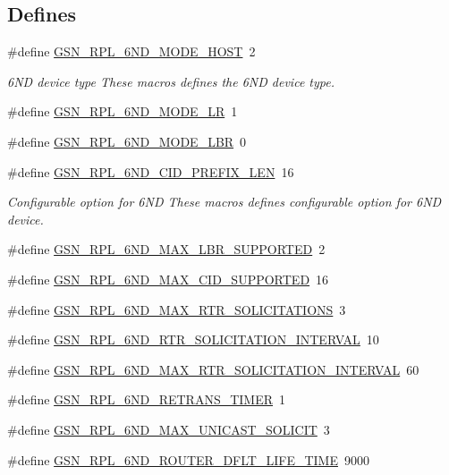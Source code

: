 \subsection*{Defines}
\begin{DoxyCompactItemize}
\item 
\#define \hyperlink{a00473_a189e6e0e1158b69710738801abe2bcbd}{GSN\_\-RPL\_\-6ND\_\-MODE\_\-HOST}~2
\begin{DoxyCompactList}\small\item\em 6ND device type These macros defines the 6ND device type. \end{DoxyCompactList}\item 
\#define \hyperlink{a00473_a53a1539675f4ce93068d86f3e7b1ea64}{GSN\_\-RPL\_\-6ND\_\-MODE\_\-LR}~1
\item 
\#define \hyperlink{a00473_aa4574cefa86dc0bb763c7a4125767ba1}{GSN\_\-RPL\_\-6ND\_\-MODE\_\-LBR}~0
\item 
\#define \hyperlink{a00473_a15bbd2855dec494244c0b4c6155ff66f}{GSN\_\-RPL\_\-6ND\_\-CID\_\-PREFIX\_\-LEN}~16
\begin{DoxyCompactList}\small\item\em Configurable option for 6ND These macros defines configurable option for 6ND device. \end{DoxyCompactList}\item 
\#define \hyperlink{a00473_a4b606925279bd0c5fc08e2bcd58c4cb5}{GSN\_\-RPL\_\-6ND\_\-MAX\_\-LBR\_\-SUPPORTED}~2
\item 
\#define \hyperlink{a00473_ad10ba50282fc0393644e37c0a600d6a0}{GSN\_\-RPL\_\-6ND\_\-MAX\_\-CID\_\-SUPPORTED}~16
\item 
\#define \hyperlink{a00473_a20f756f4d9b91af664bcf8a40cd2dfde}{GSN\_\-RPL\_\-6ND\_\-MAX\_\-RTR\_\-SOLICITATIONS}~3
\item 
\#define \hyperlink{a00473_a7342fab62085d659e89dfd26a75c64a1}{GSN\_\-RPL\_\-6ND\_\-RTR\_\-SOLICITATION\_\-INTERVAL}~10
\item 
\#define \hyperlink{a00473_a7560b679f6eb8829592f407a2c0ba612}{GSN\_\-RPL\_\-6ND\_\-MAX\_\-RTR\_\-SOLICITATION\_\-INTERVAL}~60
\item 
\#define \hyperlink{a00473_a35cfb15e0c380537b0fb8fce788a4034}{GSN\_\-RPL\_\-6ND\_\-RETRANS\_\-TIMER}~1
\item 
\#define \hyperlink{a00473_a7e40d4d5b5e886c51ae68eb1f2f00203}{GSN\_\-RPL\_\-6ND\_\-MAX\_\-UNICAST\_\-SOLICIT}~3
\item 
\#define \hyperlink{a00473_a724fcb51530345d55dcc892795b9727f}{GSN\_\-RPL\_\-6ND\_\-ROUTER\_\-DFLT\_\-LIFE\_\-TIME}~9000

\end{DoxyCompactItemize}
